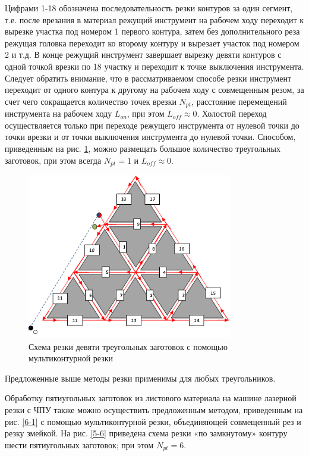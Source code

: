 \documentclass[12pt]{report}
\begin{document}
Цифрами 1-18 обозначена последовательность
резки контуров за один сегмент,
т.е. после врезания в материал режущий инструмент
на рабочем ходу переходит к вырезке участка
под номером 1 первого контура,
затем без дополнительного реза режущая
головка переходит ко второму контуру и
вырезает участок под номером 2 и т.д.
В конце режущий инструмент завершает
вырезку девяти контуров с одной точкой врезки
по 18 участку и переходит к точке выключения инструмента.
Следует обратить внимание, что в рассматриваемом способе
резки инструмент переходит от одного контура к
другому на рабочем ходу с совмещенным резом,
за счет чего сокращается количество точек врезки $N_{pt}$,
расстояние перемещений инструмента на рабочем ходу  $L_{on}$,
при этом
$L_{off} \approx 0$.
Холостой переход осуществляется
только при переходе режущего инструмента
от нулевой точки до точки врезки и от
точки выключения инструмента до нулевой точки.
Способом, приведенным на рис. \ref{3-10},
можно размещать большое количество
треугольных заготовок, при этом всегда $N_{pt}=1$
и $L_{off} \approx 0$.

\begin{figure}
  \begin{center}
  \includegraphics[width=0.8\textwidth]{3-10.png}
  \caption{Схема резки девяти треугольных заготовок с помощью мультиконтурной резки}
  \label{3-10}
  \end{center}
\end{figure}

Предложенные выше методы резки  применимы для любых треугольников.

Обработку пятиугольных заготовок из листового материала
на машине лазерной резки с ЧПУ также можно осуществить
предложенным методом, приведенным на рис. \ref{6-1}
с помощью мультиконтурной резки,
объединяющей совмещенный рез и резку змейкой.
На рис. \ref{5-6}
приведена схема резки «по замкнутому» контуру
шести пятиугольных заготовок;
при этом $N_{pt}=6$.
\end{document}
